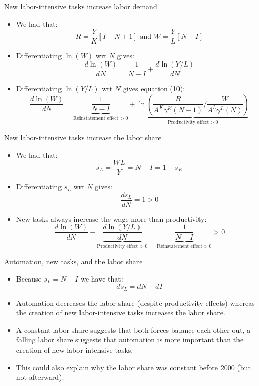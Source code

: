 \documentclass[notes=show]{beamer}
\begin{document}
\begin{frame}{New labor-intensive tasks increase labor demand}
\begin{itemize}
\item We had that:
\[
R = \frac{Y}{K}[I-N+1] \text{ and }  W = \frac{Y}{L}[N-I] \tag{5}
\]
\item Differentiating $\ln(W)$ wrt $N$ gives:
\[
\frac{d\ln(W)}{dN}=\frac{1}{N-I} + \frac{d\ln(Y/L)}{dN}
\] 
\item Differentiating $\ln(Y/L)$ wrt $N$ gives \underline{equation (10)}:
\[
\frac{d\ln(W)}{dN}=\underbrace{\frac{1}{N-I}}_{\text{Reinstatement effect}>0} +   \underbrace{\ln \left( \frac{R}{A^{K}\gamma^{K}(N-1)} / \frac{W}{A^{L}\gamma^{L}(N)} \right) }_{\text{Productivity effect}>0} \label{eq10}
\]
\end{itemize}
\end{frame}

\begin{frame}{New labor-intensive tasks increase the labor share}
\begin{itemize}
\item We had that:
\[
s_{L} = \frac{WL}{Y} = N-I  = 1 - s_{K} \tag{6}
\]
\item Differentiating $s_{L}$ wrt $N$ gives:
\[
\frac{ds_{L}}{dN} = 1 > 0
\]
\item New tasks always increase the wage more than productivity:
\[
\frac{d\ln(W)}{dN} - \underbrace{\frac{d\ln(Y/L)}{dN}}_{\text{Productivity effect}>0} =\underbrace{\frac{1}{N-I}}_{\text{Reinstatement effect}>0} >0
\]
\end{itemize}
\end{frame}

\begin{frame}{Automation, new tasks, and the labor share}
\begin{itemize}
\item Because $s_{L}=N-I$ we have that:
\[
ds_{L}=dN-dI
\]
\item Automation decreases the labor share (despite productivity effects) whereas the creation of new labor-intensive tasks increases the labor share. \medskip
\item A constant labor share suggests that both forces balance each other out, a falling labor share suggests that automation is more important than the creation of new labor intensive tasks.
\item This could also explain why the labor share was constant before 2000 (but not afterward).
\end{itemize}
\end{frame}
\end{document}
